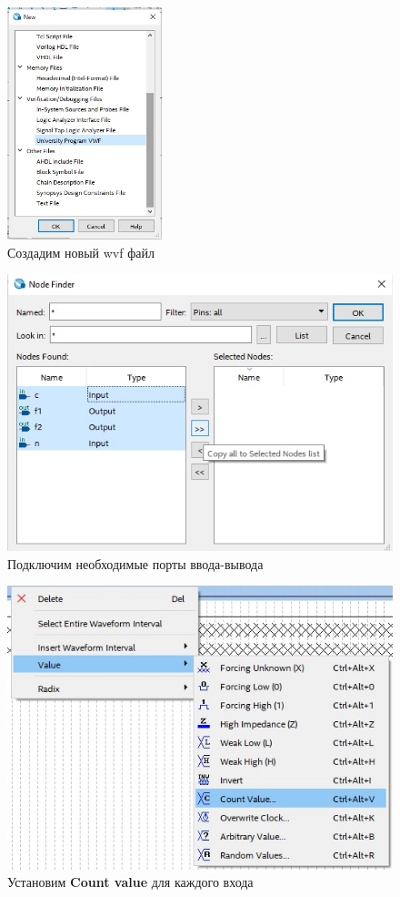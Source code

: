\documentclass[a4paper,12pt]{article}
\begin{document}
  \begin{figure}[H]
    \centering
    \includegraphics[width=4.5cm]{01_12}
    \caption{Создадим новый wvf файл}
  \end{figure}

  \begin{figure}[H]
    \centering
    \includegraphics[width=12cm]{01_13}
    \caption{Подключим необходимые порты ввода-вывода}
  \end{figure}

  \begin{figure}[H]
    \centering
    \includegraphics[width=12cm]{01_14}
    \caption{Установим \textbf{Count value} для каждого входа}
  \end{figure}
\end{document}
